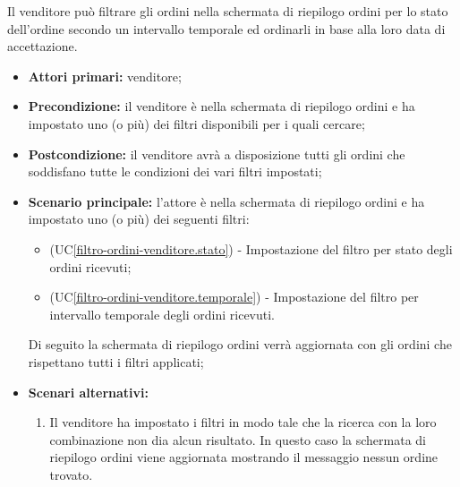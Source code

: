 Il venditore può filtrare gli ordini nella schermata di riepilogo ordini per lo stato dell'ordine secondo un intervallo temporale ed ordinarli in base alla loro data di accettazione.
\begin{itemize}
	\item \textbf{Attori primari:} venditore;
	\item \textbf{Precondizione:} il venditore è nella schermata di riepilogo ordini e ha impostato uno (o più) dei filtri disponibili per i quali cercare;
	\item \textbf{Postcondizione:} il venditore avrà a disposizione tutti gli ordini che soddisfano tutte le condizioni dei vari filtri impostati;
	\item \textbf{Scenario principale:} l'attore è nella schermata di riepilogo ordini e ha impostato uno (o più) dei seguenti filtri:
	\begin{itemize}
		\item (UC\ref{filtro-ordini-venditore.stato}) - Impostazione del filtro per stato degli ordini ricevuti;
		\item (UC\ref{filtro-ordini-venditore.temporale}) - Impostazione del filtro per intervallo temporale degli ordini ricevuti.
	\end{itemize}
	Di seguito la schermata di riepilogo ordini verrà aggiornata con gli ordini che rispettano tutti i filtri applicati;
	\item \textbf{Scenari alternativi:}
	\begin{enumerate}[label=\lett]
		\item Il venditore ha impostato i filtri in modo tale che la ricerca con la loro combinazione non dia alcun risultato. In questo caso la schermata di riepilogo ordini viene aggiornata mostrando il messaggio nessun ordine trovato.
	\end{enumerate}
\end{itemize}

\label{filtro-ordini-venditore.stato}

